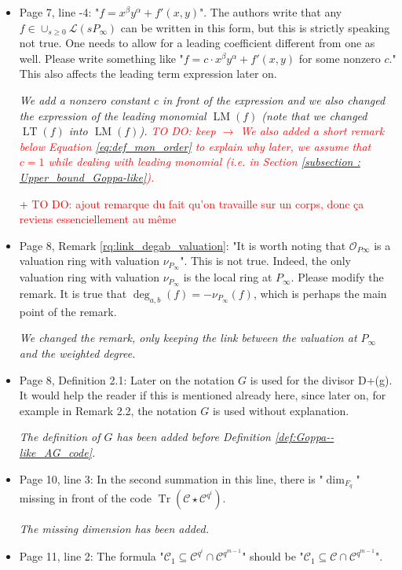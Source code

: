 \documentclass[12pt,a4paper]{amsart}
\newcommand\TODO[1]{\textcolor{red}{TO DO: #1}}
\DeclareMathOperator{\trace}{Tr}
\newcommand{\calC}{\mathcal{C}}
\newcommand{\Tr}[1]{\trace\!\left(#1\right)}
\begin{document}
\begin{itemize}
\item Page 7, line -4: "$f=x^\beta y^\alpha+f'(x,y)$". The authors write that any $f \in \cup_{s \ge 0} \mathcal{L}(sP_\infty)$ can be written in this form, but this is strictly speaking not true. One needs to allow for a leading coefficient different from one as well. Please write something like "$f=c\cdot x^\beta y^\alpha+f'(x,y)$ for some nonzero $c$." This also affects the leading term expression later on.

\textit{We add a nonzero constant $c$ in front of the expression and we also changed the expression of the leading monomial $\operatorname{LM}(f)$ (note that we changed $\operatorname{LT}(f)$ into $\operatorname{LM}(f)$). \TODO{ keep $\rightarrow$ We also added a short remark below Equation \eqref{eq:def_mon_order} to explain why later, we assume that $c=1$ while dealing with leading monomial (i.e. in Section \ref{subsection : Upper_bound_Goppa-like}).} }

+ \TODO{ajout remarque du fait qu'on travaille sur un corps, donc ça reviens essenciellement au même}


\item Page 8, Remark \ref{rq:link_degab_valuation}: "It is worth noting that $\mathcal{O}_{P\infty}$ is a valuation ring with valuation $\nu_{P_\infty}$". This is not true. Indeed, the only valuation ring with valuation $\nu_{P_\infty}$ is the local ring at $P_\infty$. Please modify the remark. It is true that $\deg_{a,b}(f)=-\nu_{P_\infty}(f)$, which is perhaps the main point of the remark.

\textit{We changed the remark, only keeping the link between the valuation at $P_\infty$ and the weighted degree.}


\item Page 8, Definition 2.1: Later on the notation $G$ is used for the divisor D+(g). It would help the reader if this is mentioned already here, since later on, for example in Remark 2.2, the notation $G$ is used without explanation.

\textit{The definition of $G$ has been added before Definition \ref{def:Goppa--like_AG_code}.}


\item Page 10, line 3: In the second summation in this line, there is "$\dim_{F_{q}}$" missing in front of the code $\Tr{\calC \star \calC^{q^i}}$.

\textit{The missing dimension has been added.}

\item Page 11, line 2: The formula "$\calC_1 \subseteq \calC^{q^i} \cap \calC^{q^{m-1}}$" should be "$\calC_1 \subseteq \calC \cap \calC^{q^{m-1}}$". 


\end{itemize}
\end{document}

